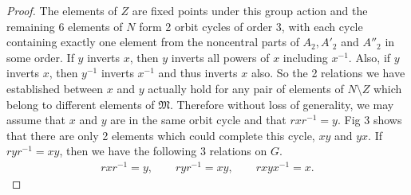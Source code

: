 \begin{proof}






The elements of $Z$ are fixed points under this group action and the remaining 6 elements of $N$ form 2 orbit cycles of order 3, with each cycle containing exactly one element from the noncentral parts of $A_2, A'_2$ and $A''_2$ in some order. If $y$ inverts $x$, then $y$ inverts all powers of $x$ including $x^{-1}$. Also, if $y$ inverts $x$, then $y^{-1}$ inverts $x^{-1}$ and thus inverts $x$ also. So the 2 relations we have established between $x$ and $y$ actually hold for any pair of elements of $N \! \setminus \! Z$ which belong to different elements of $\mathfrak{M}$. Therefore without loss of generality, we may assume that $x$ and $y$ are in the same orbit cycle and that $r x r^{-1} = y$. Fig 3 shows that there are only 2 elements which could complete this cycle, $xy$ and $yx$. If $r y r^{-1} = xy$, then we have the following 3 relations on $G$.
\begin{align}\label{3rel} r x r^{-1} = y, \qquad r y r^{-1} = xy, \qquad r xy x^{-1} = x.
\end{align}


\end{proof}
